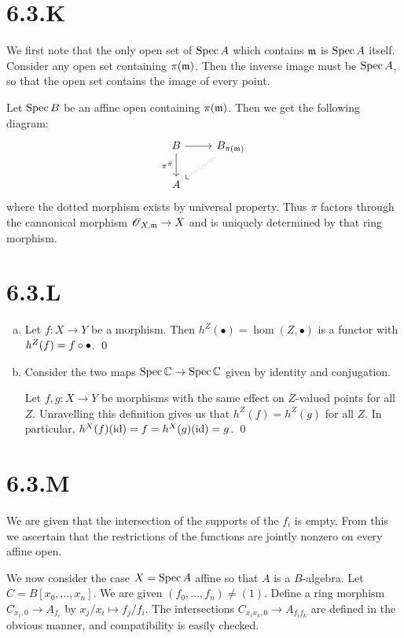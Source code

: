 \documentclass{article}
\begin{document}
\section{6.3.K}
We first note that the only open set of $\operatorname{Spec} A$ which contains
$\mathfrak{m}$ is $\operatorname{Spec} A$ itself. Consider any open
set containing $\pi(\mathfrak{m})$. Then the inverse image must be
$\operatorname{Spec} A$, so that the open set contains the image of every
point.

Let $\operatorname{Spec} B$ be an affine open containing
$\pi(\mathfrak{m})$. Then we get the following diagram:
\[
    \begin{tikzcd}
        B \ar[r] \ar[d, "\pi^{\#}", swap] & B_{\pi(\m)} \ar[dl, dotted] \\
        A
    \end{tikzcd}
\] where the dotted morphism exists by universal property.
Thus $\pi$ factors through the cannonical morphism
$\operatorname{\mathscr{O}}_{X,\mathfrak{m}} \to X$ and is uniquely determined by that ring morphism.

\section{6.3.L}
\begin{enumerate}[a.]
    \item Let $f: X \to Y$ be a morphism. Then $h^Z(\bullet)=\hom(Z, \bullet)$ is a
          functor with $h^Z(f)=f \circ \bullet$. \qed
    \item Consider the two maps $\operatorname{Spec} \mathbb{C} \to \operatorname{Spec} \mathbb{C}$ given by identity and conjugation.

          Let $f, g: X \to Y$ be morphisms with the same effect on
          $Z$-valued points for all $Z$. Unravelling
          this definition gives us that $h^Z(f)=h^Z(g)$ for all
          $Z$. In particular, $h^X(f)(\operatorname{id})=f=h^X(g)(\operatorname{id})=g$. \qed
\end{enumerate}

\section{6.3.M}
We are given that the intersection of the supports of the
$f_i$ is empty. From this we ascertain that the restrictions
of the functions are jointly nonzero on every affine open.

We now consider the case $X=\operatorname{Spec} A$ affine so that
$A$ is a $B$-algebra. Let
$C=B[x_0, \dots, x_n]$. We are given $(f_0, \dots, f_n) \neq (1)$. Define a ring
morphism $C_{x_i,0} \to A_{f_i}$ by $x_j/x_i \mapsto f_j/f_i$. The intersections
$C_{x_ix_k,0} \to A_{f_if_k}$ are defined in the obvious manner, and compatibility is
easily checked.
\end{document}
